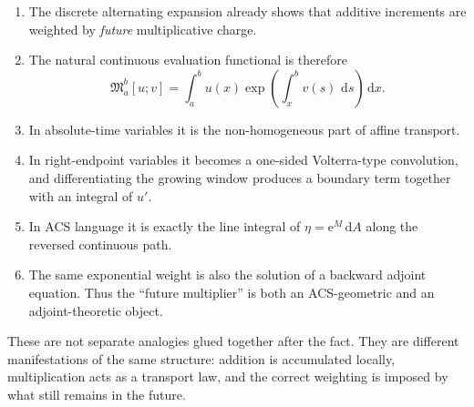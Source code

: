 \documentclass[11pt]{article}
\newcommand{\maint}[2]{\mathfrak{M}_{#1}^{#2}}
\newcommand{\dd}{\,\mathrm{d}}
\newcommand{\ee}{\mathrm{e}}
\begin{document}
\begin{enumerate}[leftmargin=1.5em]
\item The discrete alternating expansion already shows that additive increments are weighted by \emph{future} multiplicative charge.
\item The natural continuous evaluation functional is therefore
\[
\maint{a}{b}[u;v]=\int_a^b u(x)\exp\!\left(\int_x^b v(s)\,\dd s\right)\dd x.
\]
\item In absolute-time variables it is the non-homogeneous part of affine transport.
\item In right-endpoint variables it becomes a one-sided Volterra-type convolution, and differentiating the growing window produces a boundary term together with an integral of $u'$.
\item In ACS language it is exactly the line integral of $\eta=\ee^M\dd A$ along the reversed continuous path.
\item The same exponential weight is also the solution of a backward adjoint equation. Thus the ``future multiplier'' is both an ACS-geometric and an adjoint-theoretic object.
\end{enumerate}

These are not separate analogies glued together after the fact. They are different manifestations of the same structure: addition is accumulated locally, multiplication acts as a transport law, and the correct weighting is imposed by what still remains in the future.
\end{document}
